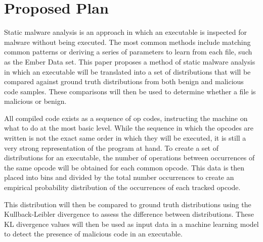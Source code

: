 


\section{Proposed Plan}

Static malware analysis is an approach in which an executable is inspected for malware without being executed. The
most common methods include matching common patterns or deriving a series of parameters to learn from each file,
such as the Ember Data set\cite{ember}.
This paper proposes a method of static malware analysis in which an executable will be translated into a set of distributions that will be compared against ground truth distributions from both
benign and malicious code samples.
These comparisons will then be used to determine whether a file is malicious or
benign.

All compiled code exists as a sequence of op codes, instructing the machine on what to do at the most basic level.
While the sequence in which the opcodes are written is not the exact same order in which they will be executed, it
is still a very strong representation of the program at hand.
To create a set of distributions for an executable,
the number of operations between occurrences of the same opcode will be obtained for each common opcode.
This data is then placed into bins and divided by the total number occurrences to create an empirical
probability distribution of the occurrences of each tracked opcode.

This distribution will then be compared to ground truth distributions using the Kullback-Leibler divergence to
assess the difference between distributions.
These KL divergence values will then be used as input data in a machine learning model to detect the
presence of malicious code in an executable.

